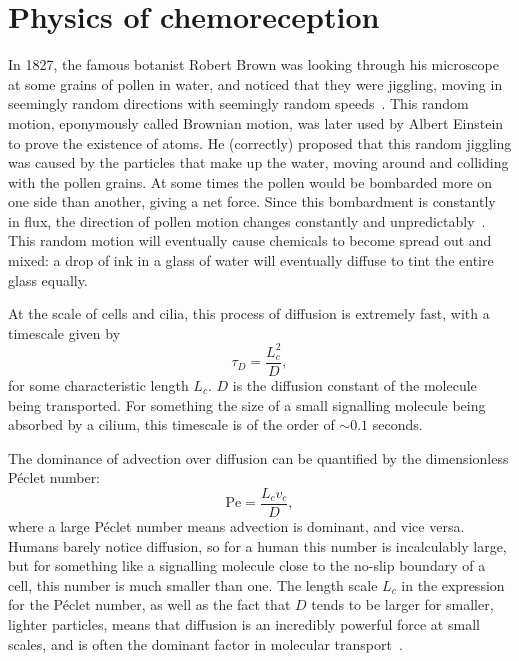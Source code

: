 \section{Physics of chemoreception}
In 1827, the famous botanist Robert Brown was looking through his microscope at some grains of pollen in water, and noticed that they were jiggling, moving in seemingly random directions with seemingly random speeds~. This random motion, eponymously called Brownian motion, was later used by Albert Einstein to prove the existence of atoms. He (correctly) proposed that this random jiggling was caused by the particles that make up the water, moving around and colliding with the pollen grains. At some times the pollen would be bombarded more on one side than another, giving a net force. Since this bombardment is constantly in flux, the direction of pollen motion changes constantly and unpredictably~. This random motion will eventually cause chemicals to become spread out and mixed: a drop of ink in a glass of water will eventually diffuse to tint the entire glass equally.

At the scale of cells and cilia, this process of diffusion is extremely fast, with a timescale given by
\begin{equation}
    \tau_D = \frac{L_c^2}{D},\label{eq:diffusion_scale}
\end{equation}
for some characteristic length $L_c$. $D$ is the diffusion constant of the molecule being transported. 
For something the size of a small signalling molecule being absorbed by a cilium, this timescale is of the order of $\sim 0.1$ seconds. 


The dominance of advection over diffusion can be quantified by the dimensionless Péclet number:
\begin{equation}
    \mathrm{Pe} = \frac{L_c v_c}{D}\label{eq:def_pe},
\end{equation}
where a large Péclet number means advection is dominant, and vice versa. Humans barely notice diffusion, so for a human this number is incalculably large, but for something like a signalling molecule close to the no-slip boundary of a cell, this number is much smaller than one. The length scale $L_c$ in the expression for the Péclet number, as well as the fact that $D$ tends to be larger for smaller, lighter particles, means that diffusion is an incredibly powerful force at small scales, and is often the dominant factor in molecular transport~.

